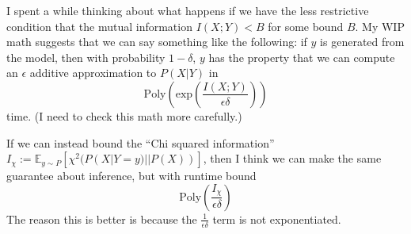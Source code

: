 \documentclass{article}
\begin{document}
I spent a while thinking about what happens if we have the less restrictive condition that the mutual information $I(X; Y) < B$ for some bound $B$.
My WIP math suggests that we can say something like the following: if $y$ is generated from the model, then with probability $1 - \delta$, $y$ has the property that we can compute an $\epsilon$ additive approximation to $P(X | Y)$ in $$\text{Poly}(\text{exp}(\frac{I(X; Y)}{\epsilon \delta}))$$ time.
(I need to check this math more carefully.)

If we can instead bound the ``Chi squared information'' $I_\chi := \mathbb{E}_{y \sim P}[\chi^2(P(X | Y = y) || P(X))]$, then I think we can make the same guarantee about inference, but with runtime bound
$$
\text{Poly}(\frac{I_\chi}{\epsilon \delta})
$$
The reason this is better is because the $\frac{1}{\epsilon \delta}$ term is not exponentiated.
\end{document}

